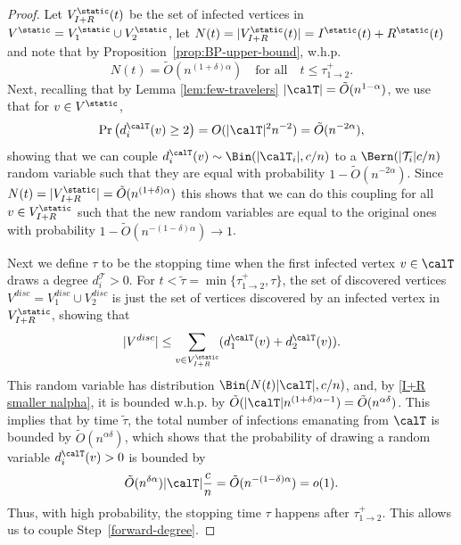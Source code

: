 \documentclass[11pt]{article}
\begin{document}
\begin{proof} 

Let $V_{I+R}^\static(t)$ be the set of infected vertices in $V^\static=V_1^\static\cup V_2^\static$,  let $N(t)=|V_{I+R}^\static(t)|=I^\static(t)+R^\static(t)$ and note that by Proposition~\ref{prop:BP-upper-bound}, w.h.p.
\begin{equation}\label{I+R smaller nalpha}
N(t)=\tilde O(n^{(1+\delta)\alpha}) \quad\text{for all}\quad t\leq \tau_{1\to 2}^+.
\end{equation}
Next, recalling that by Lemma \ref{lem:few-travelers} $|\calT| = \tilde O(n^{1-\alpha})$, we use that for $v\in V^\static$,
$$\Pr\left(d_i^\calT(v)\geq 2\right)=O(|\calT|^2n^{-2})=\tilde O(n^{-2\alpha}),
$$
showing that we can couple $d_i^{\calT}(v)\sim \Bin(|\calT_i|,c/n)$
to  a $\Bern(|\mathcal T_i|c/n)$ random variable such that they are equal with probability $1-\tilde O(n^{-2\alpha})$.
Since $N(t)=|V_{I+R}^\static|=\tilde O(n^{(1+\delta)\alpha})$ this shows that we can do this coupling for all
$v\in V_{I+R}^\static$ such that the new random variables are equal to the original ones with probability
$1-\tilde O(n^{-(1-\delta)\alpha})\to 1$.

Next we define $\tau$ to be the stopping time when the first infected vertex $v\in\calT$ draws a degree $d_i^\mathcal T>0$. For $t<\tilde\tau=\min\{\tau_{1\to 2}^+,\tau\}$, the set of discovered vertices $V^{disc} = V_1^{disc} \cup V_2^{disc}$ is just the set of vertices discovered by an infected vertex in $V_{I+R}^\static$, showing that
$$
|V^{disc}|\leq\sum_{v\in V_{I+R}^\static}(d_1^\calT(v)+d_2^\calT(v)).$$  This random variable has 
distribution $\Bin(N(t)|\calT|,c/n)$, and, by \eqref{I+R smaller nalpha}, it is bounded w.h.p. by $\tilde O(|\calT|n^{(1+\delta)\alpha-1})=\tilde O(n^{\alpha\delta})$. This implies that by time $\tilde \tau$, the total number of infections emanating from $\calT$ is bounded by $\tilde O(n^{\alpha\delta})$, which shows that the probability of drawing a random variable $d_i^\calT(v)>0$ is bounded by
\[
\tilde O(n^{\delta \alpha})|\calT|\frac cn=
\tilde O(n^{-(1-\delta)\alpha})=o(1).
\]
Thus, with high probability, the stopping time $\tau$
happens after $\tau_{1\to 2}^+$.  
This allows us to couple Step~\ref{forward-degree}.


\end{proof}
\end{document}
